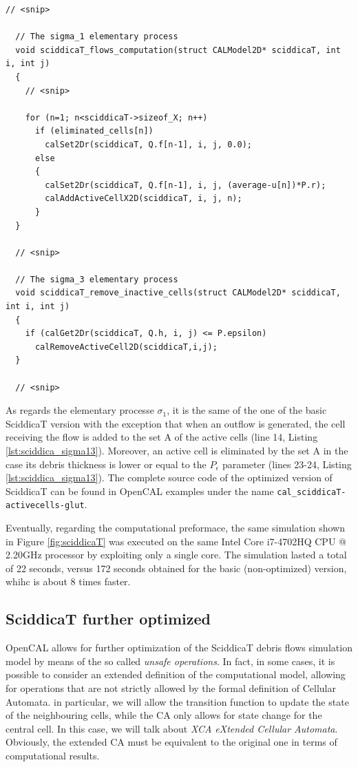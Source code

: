 \begin{lstlisting}[float,floatplacement=H, label=lst:sciddica_sigma13, caption=The $\sigma_1$ and $\sigma_3$ SciddicaT elementary processes with active cells optimization.]
  // <snip>

  // The sigma_1 elementary process
  void sciddicaT_flows_computation(struct CALModel2D* sciddicaT, int i, int j)
  {
    // <snip>
    
    for (n=1; n<sciddicaT->sizeof_X; n++)
      if (eliminated_cells[n])
        calSet2Dr(sciddicaT, Q.f[n-1], i, j, 0.0);
      else
      {
        calSet2Dr(sciddicaT, Q.f[n-1], i, j, (average-u[n])*P.r);
        calAddActiveCellX2D(sciddicaT, i, j, n);
      }
  }

  // <snip>
  
  // The sigma_3 elementary process
  void sciddicaT_remove_inactive_cells(struct CALModel2D* sciddicaT, int i, int j)
  {
    if (calGet2Dr(sciddicaT, Q.h, i, j) <= P.epsilon)
      calRemoveActiveCell2D(sciddicaT,i,j);
  }

  // <snip>
\end{lstlisting}

As regards the elementary processe $\sigma_1$, it is the same of the
one of the basic SciddicaT version with the exception that when an
outflow is generated, the cell receiving the flow is added to the set
A of the active cells (line 14, Listing
\ref{lst:sciddica_sigma13}). Moreover, an active cell is eliminated by
the set A in the case its debris thickness is lower or equal to the
$P_\epsilon$ parameter (lines 23-24, Listing
\ref{lst:sciddica_sigma13}). The complete source code of the optimized
version of SciddicaT can be found in OpenCAL examples under the name
\verb'cal_sciddicaT-activecells-glut'.

Eventually, regarding the computational preformace, the same
simulation shown in Figure \ref{fig:sciddicaT} was executed on the
same Intel Core i7-4702HQ CPU @ 2.20GHz processor by exploiting only a
single core. The simulation lasted a total of 22 seconds, versus 172
seconds obtained for the basic (non-optimized) version, whihc is about
8 times faster.

\subsection{SciddicaT further optimized}
OpenCAL allows for further optimization of the SciddicaT debris flows
simulation model by means of the so called \emph{unsafe
  operations}. In fact, in some cases, it is possible to consider an
extended definition of the computational model, allowing for
operations that are not strictly allowed by the formal definition of
Cellular Automata. in particular, we will allow the transition
function to update the state of the neighbouring cells, while the CA
only allows for state change for the central cell. In this case, we
will talk about \emph{XCA eXtended Cellular Automata}. Obviously, the
extended CA must be equivalent to the original one in terms of
computational results.

